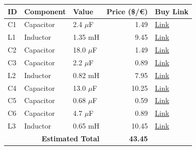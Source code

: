 \begin{table}[H]
    \centering
    \renewcommand{\arraystretch}{1.5}
    \begin{tabular}{@{}lllrl@{}}
        \toprule
        \textbf{ID} & \textbf{Component} & \textbf{Value} & \textbf{Price (\$/€)} & \textbf{Buy Link} \\
        \midrule
        C1 & Capacitor & 2.4 $\mu$F & 1.49 & \href{https://www.soundimports.eu/en/jantzen-audio-001-0239.html}{Link} \\
        L1 & Inductor & 1.35 mH & 9.45 & \href{https://www.soundimports.eu/en/jantzen-audio-000-5420.html}{Link} \\
        C2 & Capacitor & 18.0 $\mu$F & 1.49 & \href{https://www.soundimports.eu/en/jantzen-audio-001-6144.html}{Link} \\
        C3 & Capacitor & 2.2 $\mu$F & 0.89 & \href{https://www.parts-express.com/2.2uF-100V-Non-Polarized-Capacitor-027-324}{Link} \\
        L2 & Inductor & 0.82 mH & 7.95 & \href{https://www.soundimports.eu/en/jantzen-audio-000-2192.html}{Link} \\
        C4 & Capacitor & 13.0 $\mu$F & 10.25 & \href{https://www.soundimports.eu/en/audyn-q4-13-0-400.html}{Link} \\
        C5 & Capacitor & 0.68 $\mu$F & 0.59 & \href{https://www.parts-express.com/Dayton-Audio-DMPC-0.68-0.68uF-250V-Polypropylene-Capacitor-027-408}{Link} \\
        C6 & Capacitor & 4.7 $\mu$F & 0.89 & \href{https://www.parts-express.com/4.7uF-100V-Non-Polarized-Capacitor-027-332}{Link} \\
        L3 & Inductor & 0.65 mH & 10.45 & \href{https://www.soundimports.eu/en/jantzen-audio-000-1952.html}{Link} \\
        \midrule
        \multicolumn{3}{r}{\textbf{Estimated Total}} & \textbf{43.45} & \\
        \bottomrule
    \end{tabular}
\end{table}
